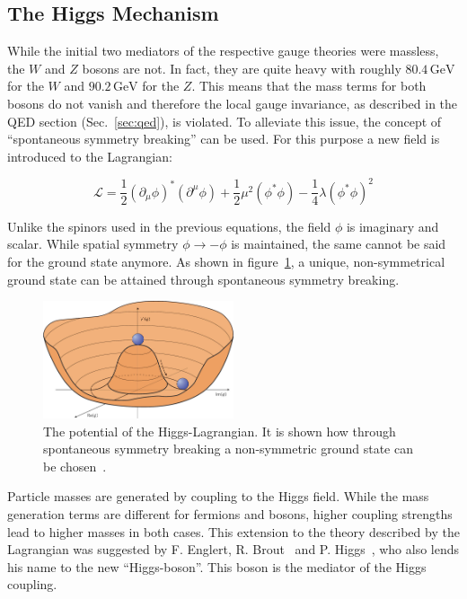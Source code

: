 \subsection{The Higgs Mechanism}
\label{sec:higgs}

While the initial two mediators of the respective gauge theories were massless, the $W$ and $Z$ bosons are not. In fact, they are quite heavy with roughly $80.4\,\text{GeV}$ for the $W$ and $90.2\,\text{GeV}$ for the $Z$. This means that the mass terms for both bosons do not vanish and therefore the local gauge invariance, as described in the QED section (Sec.~\ref{sec:qed}), is violated. To alleviate this issue, the concept of ``spontaneous symmetry breaking'' can be used. For this purpose a new field is introduced to the Lagrangian:

\begin{equation}
  \label{eq:higgslagrangian}
  \mathcal{L} =  \frac{1}{2} (\partial_\mu \phi)^* (\partial^\mu \phi)  + \frac{1}{2} \mu^2 (\phi^* \phi) - \frac{1}{4} \lambda (\phi^* \phi)^2
\end{equation}

\noindent Unlike the spinors used in the previous equations, the field $\phi$ is imaginary and scalar. While spatial symmetry $\phi \rightarrow - \phi$ is maintained, the same cannot be said for the ground state anymore. As shown in figure~\ref{fig:higgspotential}, a unique, non-symmetrical ground state can be attained through spontaneous symmetry breaking.

\begin{figure}[ht!]
  \centering
    \includegraphics[width=0.5\textwidth]{plots/higgspotential.jpg}
  \caption{The potential of the Higgs-Lagrangian. It is shown how through spontaneous symmetry breaking a non-symmetric ground state can be chosen~\cite{higgspotential}.}
  \label{fig:higgspotential}
\end{figure}

Particle masses are generated by coupling to the Higgs field. While the mass generation terms are different for fermions and bosons, higher coupling strengths lead to higher masses in both cases. This extension to the theory described by the Lagrangian was suggested by F. Englert, R. Brout~\cite{higgs-englert} and P. Higgs~\cite{higgs-peter}, who also lends his name to the new ``Higgs-boson''. This boson is the mediator of the Higgs coupling.

